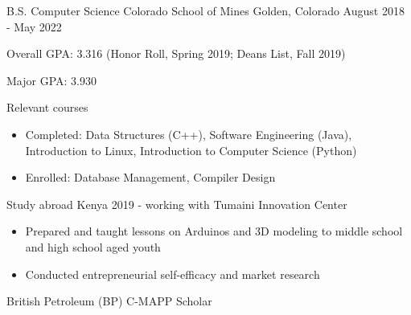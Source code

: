 \vspace{-2.0mm}


\begin{cventries}

  \cventry
    {B.S. Computer Science}
    {Colorado School of Mines} %
    {Golden, Colorado} %
    {August 2018 - May 2022} %
    {
      \begin{cvitems} %
        \item {Overall GPA: 3.316 (Honor Roll, Spring 2019; Deans
    List, Fall 2019)}
    \item {Major GPA: 3.930}
        \item {Relevant courses}
        \begin {itemize}
               \item {Completed: Data Structures (C++), Software
    Engineering (Java), Introduction to Linux, Introduction to
    Computer Science (Python)}
        \item {Enrolled: Database Management, Compiler Design}
       \end {itemize}
\item {Study abroad Kenya 2019 - working with Tumaini Innovation Center}
  \begin{itemize}
    \item {Prepared and taught lessons on Arduinos and 3D modeling to
    middle school and high school aged youth}
    \item {Conducted entrepreneurial self-efficacy and market research}
\end{itemize}
\item {British Petroleum (BP) C-MAPP Scholar}
      \end{cvitems}
    }



\end{cventries}

